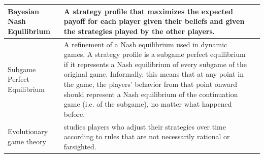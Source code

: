 \documentclass[runningheads]{llncs}
\begin{document}
\begin{table}
\begin{tabular}{ | m{2cm} | m{8cm}| m{4cm} | }
\hline
Bayesian Nash Equilibrium & {A strategy profile that maximizes the expected payoff for each player given their beliefs and given the strategies played by the other players.
} & \citet{kajii_morris_1995}\\
\hline
Subgame Perfect Equilibrium & {A refinement of a Nash equilibrium used in dynamic games. A strategy profile is a subgame perfect equilibrium if it represents a Nash equilibrium of every subgame of the original game. Informally, this means that at any point in the game, the players' behavior from that point onward should represent a Nash equilibrium of the continuation game (i.e. of the subgame), no matter what happened before.
} & \citet{osborne_2017}\\
\hline
Evolutionary game theory & {studies players who adjust their strategies over time according to rules that are not necessarily rational or farsighted.
} & \citet{newton_2018}\\



\hline
\end{tabular}
\end{table}






%
%


%
\end{document}
